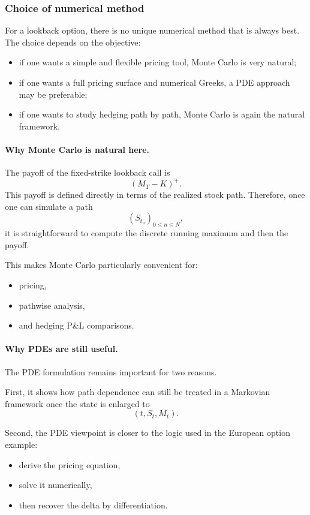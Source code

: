 \documentclass[11pt]{article}
\theoremstyle{plain}
\theoremstyle{definition}
\theoremstyle{remark}
\begin{document}
\subsubsection{Choice of numerical method}

For a lookback option, there is no unique numerical method that is
always best.
The choice depends on the objective:
\begin{itemize}[leftmargin=1.4em]
    \item if one wants a simple and flexible pricing tool, Monte Carlo is
    very natural;
    \item if one wants a full pricing surface and numerical Greeks, a PDE
    approach may be preferable;
    \item if one wants to study hedging path by path, Monte Carlo is
    again the natural framework.
\end{itemize}

\paragraph{Why Monte Carlo is natural here.}
The payoff of the fixed-strike lookback call is
\[
(M_T-K)^+.
\]
This payoff is defined directly in terms of the realized stock path.
Therefore, once one can simulate a path
\[
(S_{t_n})_{0\le n\le N},
\]
it is straightforward to compute the discrete running maximum and then
the payoff.

This makes Monte Carlo particularly convenient for:
\begin{itemize}[leftmargin=1.4em]
    \item pricing,
    \item pathwise analysis,
    \item and hedging P\&L comparisons.
\end{itemize}

\paragraph{Why PDEs are still useful.}
The PDE formulation remains important for two reasons.

First, it shows how path dependence can still be treated in a Markovian
framework once the state is enlarged to
\[
(t,S_t,M_t).
\]

Second, the PDE viewpoint is closer to the logic used in the European
option example:
\begin{itemize}[leftmargin=1.4em]
    \item derive the pricing equation,
    \item solve it numerically,
    \item then recover the delta by differentiation.
\end{itemize}
\end{document}
